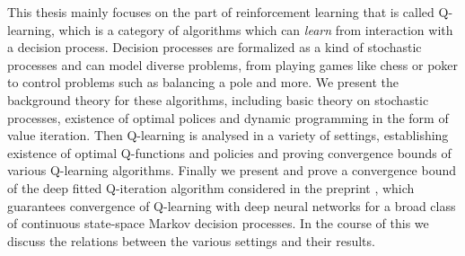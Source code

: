 
This thesis mainly focuses on the part of reinforcement learning that is called
Q-learning, which is a category of algorithms which can \emph{learn} from
interaction with a decision process.
Decision processes are formalized as a kind of stochastic processes and
can model diverse problems, from playing games like 
chess or poker to control problems such
as balancing a pole and more.
We present the background theory for these algorithms,
including basic theory on stochastic processes,
existence of optimal polices and
dynamic programming in the form of value iteration.
Then Q-learning is analysed in a variety of settings,
establishing existence of optimal Q-functions and policies
and proving convergence bounds of various Q-learning algorithms.
Finally we present and prove a convergence bound of the
deep fitted Q-iteration algorithm considered in the preprint ,
which guarantees convergence of Q-learning with deep neural networks
for a broad class of continuous state-space Markov decision processes.
In the course of this we discuss the relations between the various settings
and their results.
